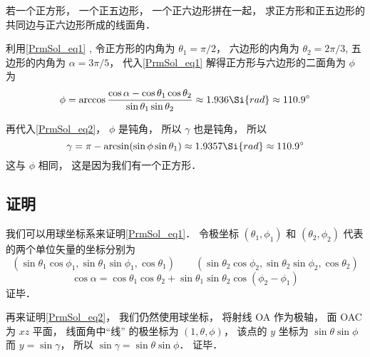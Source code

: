 \begin{example}{}
若一个正方形， 一个正五边形， 一个正六边形拼在一起， 求正方形和正五边形的共同边与正六边形所成的线面角．

利用\autoref{PrmSol_eq1} , 令正方形的内角为 $\theta_1 = \pi/2$， 六边形的内角为 $\theta_2 = 2\pi/3$, 五边形的内角为 $\alpha = 3\pi/5$， 代入\autoref{PrmSol_eq1} 解得正方形与六边形的二面角为 $\phi$ 为
\begin{equation}
\phi = \arccos\frac{\cos\alpha - \cos\theta_1 \cos\theta_2}{\sin\theta_1\sin\theta_2} \approx 1.936\Si{rad} \approx 110.9^\circ
\end{equation}

再代入\autoref{PrmSol_eq2}， $\phi$ 是钝角， 所以 $\gamma$ 也是钝角， 所以
\begin{equation}
\gamma = \pi - \arcsin(\sin\phi \sin\theta_1) \approx 1.9357 \Si{rad} \approx 110.9^\circ
\end{equation}
这与 $\phi$ 相同， 这是因为我们有一个正方形．
\end{example}

\subsection{证明}
我们可以用球坐标系来证明\autoref{PrmSol_eq1}． 令极坐标 $(\theta_1, \phi_1)$ 和 $(\theta_2, \phi_2)$ 代表的两个单位矢量的坐标分别为
\begin{equation}
(\sin\theta_1\cos\phi_1, \sin\theta_1\sin\phi_1, \cos\theta_1)
\qquad
(\sin\theta_2\cos\phi_2, \sin\theta_2\sin\phi_2, \cos\theta_2)
\end{equation}
\begin{equation}
\cos\alpha = \cos\theta_1 \cos\theta_2 + \sin\theta_1 \sin\theta_2 \cos(\phi_2 - \phi_1)
\end{equation}
证毕．

再来证明\autoref{PrmSol_eq2}， 我们仍然使用球坐标， 将射线 OA 作为极轴， 面 OAC 为 $xz$ 平面， 线面角中“线” 的极坐标为 $(1, \theta, \phi)$， 该点的 $y$ 坐标为 $\sin\theta \sin\phi$ 而 $y = \sin\gamma$， 所以 $\sin\gamma = \sin\theta \sin\phi$． 证毕．
